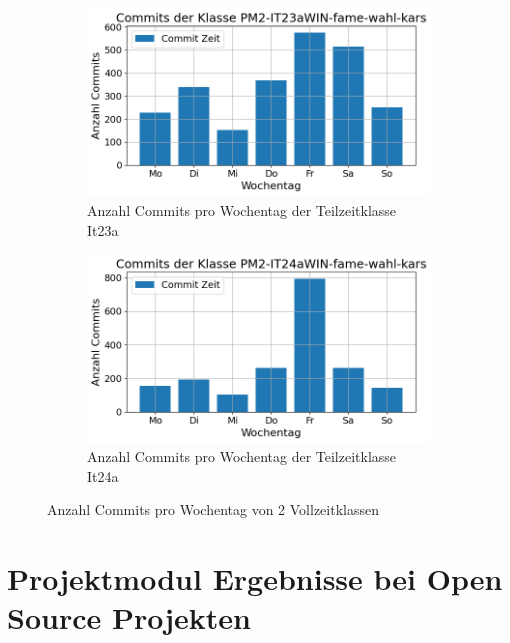 \begin{figure}[htbp]
    \centering
    \begin{subfigure}[b]{0.48\textwidth}
        \centering
        \includegraphics[width=\textwidth]{Figures/commits-klasse-per-wochentag-23a.png}
         \caption{Anzahl Commits pro Wochentag der Teilzeitklasse It23a}
        \label{fig:anzahl-commits-pro-wochentag-it23a}
    \end{subfigure}
    \hfill
    \begin{subfigure}[b]{0.48\textwidth}
        \centering
        \includegraphics[width=\textwidth]{Figures/commits-klasse-per-wochentag-24a.png}
         \caption{Anzahl Commits pro Wochentag der Teilzeitklasse It24a}
        \label{fig:anzahl-commits-pro-wochentag-it24a}
    \end{subfigure}
    \caption{Anzahl Commits pro Wochentag von 2 Vollzeitklassen}
    \label{fig:anz-commits-vollzeit-pro-wochentag}
\end{figure}

\section{Projektmodul Ergebnisse bei Open Source Projekten}

